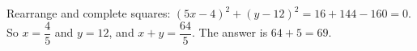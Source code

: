 Rearrange and complete squares: $(5x-4)^2+(y-12)^2=16+144-160=0$. So $x=\dfrac45$ and $y=12$, and $x+y=\dfrac{64}5$. The answer is $64+5=\boxed{69}$.

